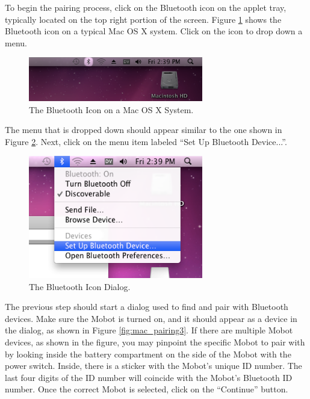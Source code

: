 \documentclass{article}
\begin{document}
To begin the pairing process, click on the Bluetooth icon on the applet tray,
typically located on the top right portion of the screen. Figure \ref{fig:mac_pairing1}
shows the Bluetooth icon on a typical Mac OS X system. Click on the icon to drop down
a menu.
\begin{figure}[H]
\begin{center}
\includegraphics[width=3in]{images/mac_pairing1.png}
\end{center}
\caption{\label{fig:mac_pairing1} The Bluetooth Icon on a Mac OS X System.}
\end{figure}

The menu that is dropped down should appear similar to the one shown in Figure \ref{fig:mac_pairing2}.
Next, click on the menu item labeled ``Set Up Bluetooth Device...''.
\begin{figure}[H]
\begin{center}
\includegraphics[width=3in]{images/mac_pairing2.png}
\end{center}
\caption{\label{fig:mac_pairing2} The Bluetooth Icon Dialog.}
\end{figure}

The previous step should start a dialog used to find and pair with Bluetooth devices. Make sure the
Mobot is turned on, and it should appear as a device in the dialog, as shown in Figure \ref{fig:mac_pairing3}.
If there are multiple Mobot devices, as shown in the figure, you may pinpoint the specific Mobot to pair
with by looking inside the battery compartment on the side of the Mobot with the power switch. Inside,
there is a sticker with the Mobot's unique ID number. The last four digits of the ID number will
coincide with the Mobot's Bluetooth ID number. Once the correct Mobot is selected, click on the ``Continue''
button.
\end{document}
